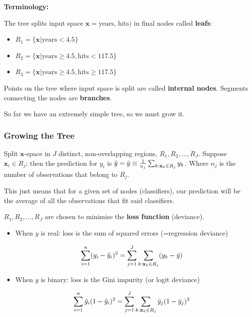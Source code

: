 \documentclass[11pt]{article}
\begin{document}
\begin{shaded}
    \textbf{Terminology:}

    The tree splits input space $\mathbf{x} = \text{years, hits})$ in final nodes called \textbf{leafs}:

    \begin{itemize}
        \item $R_1 = \{\mathbf{x}|\text{years} < 4.5\}$
        \item $R_2 = \{\mathbf{x}|\text{years} \geq 4.5, \text{hits}<117.5\}$
        \item $R_3 = \{\mathbf{x}|\text{years} \geq 4.5, \text{hits}\geq 117.5\}$
    \end{itemize}

    Points on the tree where input space is split are called \textbf{internal nodes}. Segments connecting the nodes are \textbf{branches}.
\end{shaded}

So far we have an extremely simple tree, so we must grow it.

\subsubsection{Growing the Tree}

\begin{definition}
    Split $\mathbf{x}$-space in $J$ distinct, non-overlapping regions, $R_1, R_2, \ldots, R_J$. Suppose $\mathbf{x}_i \in R_j$; then the prediction for $y_i$ is $\hat{y} = \Bar{y} \equiv \frac{1}{n_j}\sum_{k:\mathbf{x}_k\in R_j} y_k$. Where $n_j$ is the number of observations that belong to $R_j$.

    \begin{note}
        This just means that for a given set of nodes (classifiers), our prediction will be the average of all the observations that fit said classifiers.
    \end{note}

    $R_1, R_2, \ldots, R_J$ are chosen to minimise the \textbf{loss function} (deviance).

    \begin{itemize}
        \item When $y$ is real: loss is the sum of squared errors (=regression deviance)

        \begin{equation*}
            \sum_{i=1}^n(y_i - \hat{y}_i)^2 = \sum_{j=1}^J \sum_{k:\mathbf{x}_k\in R_j}(y_k - \Bar{y})
        \end{equation*}

        \item When $y$ is binary: loss is the Gini impurity (or logit deviance)

        \begin{equation*}
            \sum_{i=1}^n \hat{y}_i(1-\hat{y}_i)^2 = \sum_{j=1}^J \sum_{k:\mathbf{x}_k\in R_j} \Bar{y}_j(1-\Bar{y}_j)^2
        \end{equation*}
    \end{itemize}
\end{definition}
\end{document}
